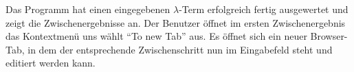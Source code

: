 \documentclass[parskip=full,11pt,twoside]{scrartcl}
\begin{document}
\teststep 
{Das Programm hat einen eingegebenen $\lambda$-Term erfolgreich fertig ausgewertet und zeigt die Zwischenergebnisse an.}
{Der Benutzer öffnet im ersten Zwischenergebnis das Kontextmenü uns wählt \enquote{To new Tab} aus.}
{Es öffnet sich ein neuer Browser-Tab, in dem der entsprechende Zwischenschritt nun im Eingabefeld steht und editiert werden kann.}





\end{document}
